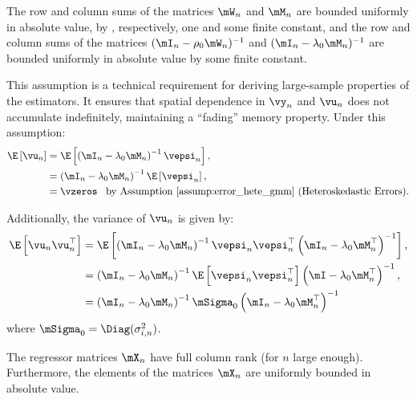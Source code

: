 \documentclass[english,12pt]{book}\usepackage[]{graphicx}\usepackage[]{xcolor}
\begin{document}
\begin{assumption}\label{assump:bounded_matrices_hetgmm}
		 The row and column sums of the matrices $\mW_n$ and $\mM_n$ are bounded uniformly in absolute value, by , respectively, one and some finite constant, and the row and column sums of the matrices $(\mI_n - \rho_0\mW_n)^{-1}$ and  $(\mI_n - \lambda_0\mM_n)^{-1}$ are bounded uniformly in absolute value by some finite constant.
\end{assumption}	

This assumption is a technical requirement for deriving large-sample properties of the estimators. It ensures that spatial dependence in $\vy_n$ and $\vu_n$ does not accumulate indefinitely, maintaining a ``fading'' memory property. Under this assumption:
\begin{equation*}
\begin{aligned}
\E\left[\vu_n \right] & = \E\left[\left(\mI_n - \lambda_0 \mM_n\right)^{-1}\vepsi_n\right],  \\
             & = \left(\mI_n - \lambda_0 \mM_n\right)^{-1} \E\left[\vepsi_n\right], \\
             & = \vzeros \;\;\;\mbox{by Assumption \ref{assump:error_hete_gmm} (Heteroskedastic Errors)}.
\end{aligned}
\end{equation*}

Additionally, the variance of $\vu_n$ is given by:
\begin{equation*}
\begin{aligned}
	\E\left[\vu_n\vu^\top_n\right] & = \E\left[\left(\mI_n - \lambda_0 \mM_n\right)^{-1}\vepsi_n\vepsi^\top_n\left(\mI_n - \lambda_0 \mM^\top_n\right)^{-1}\right], \\
	& = \left(\mI_n - \lambda_0\mM_n\right)^{-1}\E\left[\vepsi_n\vepsi^\top_n\right]\left(\mI - \lambda_0 \mM^\top_n\right)^{-1}, \\
	& = \left(\mI_n - \lambda_0 \mM_n\right)^{-1}\mSigma_0\left(\mI_n - \lambda_0\mM^\top_n\right)^{-1}
\end{aligned}
\end{equation*}
%
where $\mSigma_0 = \Diag(\sigma^2_{i,n})$.

\begin{assumption}\label{assump:no_multi_gmmhet}
The regressor matrices $\mX_n$ have full column rank (for $n$ large enough). Furthermore, the elements of the matrices $\mX_n$ are uniformly bounded in absolute value.
\end{assumption}
\end{document}
